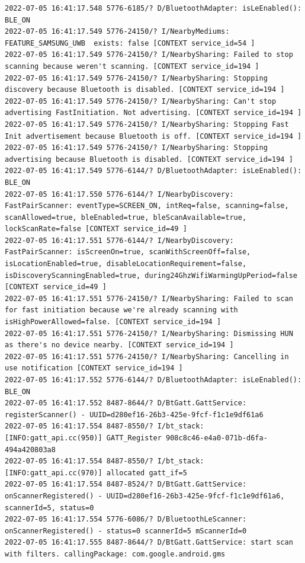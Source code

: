 \documentclass[a4paper,12pt]{book}
\begin{document}
\begin{lstlisting}
2022-07-05 16:41:17.548 5776-6185/? D/BluetoothAdapter: isLeEnabled(): BLE_ON
2022-07-05 16:41:17.549 5776-24150/? I/NearbyMediums: FEATURE_SAMSUNG_UWB  exists: false [CONTEXT service_id=54 ]
2022-07-05 16:41:17.549 5776-24150/? I/NearbySharing: Failed to stop scanning because weren't scanning. [CONTEXT service_id=194 ]
2022-07-05 16:41:17.549 5776-24150/? I/NearbySharing: Stopping discovery because Bluetooth is disabled. [CONTEXT service_id=194 ]
2022-07-05 16:41:17.549 5776-24150/? I/NearbySharing: Can't stop advertising FastInitiation. Not advertising. [CONTEXT service_id=194 ]
2022-07-05 16:41:17.549 5776-24150/? I/NearbySharing: Stopping Fast Init advertisement because Bluetooth is off. [CONTEXT service_id=194 ]
2022-07-05 16:41:17.549 5776-24150/? I/NearbySharing: Stopping advertising because Bluetooth is disabled. [CONTEXT service_id=194 ]
2022-07-05 16:41:17.549 5776-6144/? D/BluetoothAdapter: isLeEnabled(): BLE_ON
2022-07-05 16:41:17.550 5776-6144/? I/NearbyDiscovery: FastPairScanner: eventType=SCREEN_ON, intReq=false, scanning=false, scanAllowed=true, bleEnabled=true, bleScanAvailable=true, lockScanRate=false [CONTEXT service_id=49 ]
2022-07-05 16:41:17.551 5776-6144/? I/NearbyDiscovery: FastPairScanner: isScreenOn=true, scanWithScreenOff=false, isLocationEnabled=true, disableLocationRequirement=false, isDiscoveryScanningEnabled=true, during24GhzWifiWarmingUpPeriod=false [CONTEXT service_id=49 ]
2022-07-05 16:41:17.551 5776-24150/? I/NearbySharing: Failed to scan for fast initiation because we're already scanning with isHighPowerAllowed=false. [CONTEXT service_id=194 ]
2022-07-05 16:41:17.551 5776-24150/? I/NearbySharing: Dismissing HUN as there's no device nearby. [CONTEXT service_id=194 ]
2022-07-05 16:41:17.551 5776-24150/? I/NearbySharing: Cancelling in use notification [CONTEXT service_id=194 ]
2022-07-05 16:41:17.552 5776-6144/? D/BluetoothAdapter: isLeEnabled(): BLE_ON
2022-07-05 16:41:17.552 8487-8644/? D/BtGatt.GattService: registerScanner() - UUID=d280ef16-26b3-425e-9fcf-f1c1e9df61a6
2022-07-05 16:41:17.554 8487-8550/? I/bt_stack: [INFO:gatt_api.cc(950)] GATT_Register 908c8c46-e4a0-071b-d6fa-494a420803a8
2022-07-05 16:41:17.554 8487-8550/? I/bt_stack: [INFO:gatt_api.cc(970)] allocated gatt_if=5
2022-07-05 16:41:17.554 8487-8524/? D/BtGatt.GattService: onScannerRegistered() - UUID=d280ef16-26b3-425e-9fcf-f1c1e9df61a6, scannerId=5, status=0
2022-07-05 16:41:17.554 5776-6086/? D/BluetoothLeScanner: onScannerRegistered() - status=0 scannerId=5 mScannerId=0
2022-07-05 16:41:17.555 8487-8644/? D/BtGatt.GattService: start scan with filters. callingPackage: com.google.android.gms

\end{lstlisting}
\end{document}
